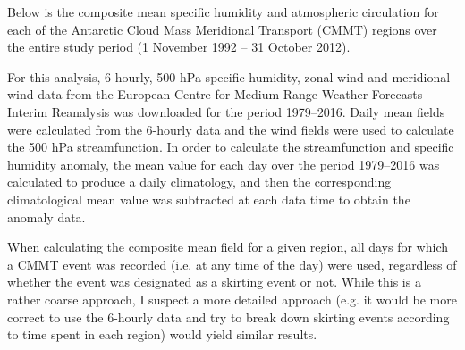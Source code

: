 Below is the composite mean specific humidity and atmospheric circulation for each of the Antarctic Cloud Mass Meridional Transport (CMMT) regions over the entire study period (1 November 1992 -- 31 October 2012).

For this analysis, 6-hourly, 500 hPa specific humidity, zonal wind and meridional wind data from the European Centre for Medium-Range Weather Forecasts Interim Reanalysis \citep[ERA-Interim;][]{Dee2011} was downloaded for the period 1979--2016. Daily mean fields were calculated from the 6-hourly data and the wind fields were used to calculate the 500 hPa streamfunction. In order to calculate the streamfunction and specific humidity anomaly, the mean value for each day over the period 1979--2016 was calculated to produce a daily climatology, and then the corresponding climatological mean value was subtracted at each data time to obtain the anomaly data.   

When calculating the composite mean field for a given region, all days for which a CMMT event was recorded (i.e. at any time of the day) were used, regardless of whether the event was designated as a skirting event or not. While this is a rather coarse approach, I suspect a more detailed approach (e.g. it would be more correct to use the 6-hourly data and try to break down skirting events according to time spent in each region) would yield similar results.

